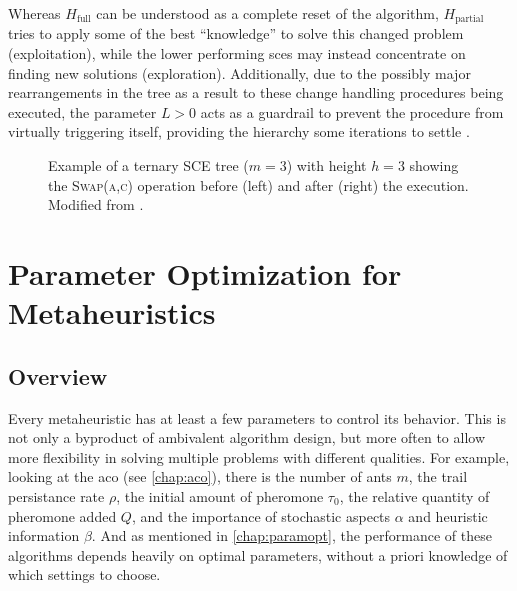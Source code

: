 Whereas $H_\text{full}$ can be understood as a complete reset of the algorithm, $H_\text{partial}$ tries to apply some of the best \enquote{knowledge} to solve this changed problem (exploitation), while the lower performing \glspl{sce} may instead concentrate on finding new solutions (exploration). Additionally, due to the possibly major rearrangements in the tree as a result to these change handling procedures being executed, the parameter $L > 0$ acts as a guardrail to prevent the procedure from virtually triggering itself, providing the hierarchy some iterations to settle \cite{kupfer2021hierarchical}.

\begin{figure}
\centering
{}
	\caption[Example of a ternary SCE tree showing a swap operation]{Example of a ternary SCE tree ($m = 3$) with height $h = 3$ showing the \textsc{Swap(a,c)} operation before (left) and after (right) the execution. Modified from \citet{kupfer2021hierarchical}.}
	\label{fig:ternary-tree}
\end{figure}



\section{Parameter Optimization for Metaheuristics}

\subsection{Overview}

Every metaheuristic has at least a few parameters to control its behavior. This is not only a byproduct of ambivalent algorithm design, but more often to allow more flexibility in solving multiple problems with different qualities. For example, looking at the \gls{aco} (see \ref{chap:aco}), there is the number of ants $m$, the trail persistance rate $\rho$, the initial amount of pheromone $\tau_0$, the relative quantity of pheromone added $Q$, and the importance of stochastic aspects $\alpha$ and heuristic information $\beta$. And as mentioned in \cref{chap:paramopt}, the performance of these algorithms depends heavily on optimal parameters, without a priori knowledge of which settings to choose.

